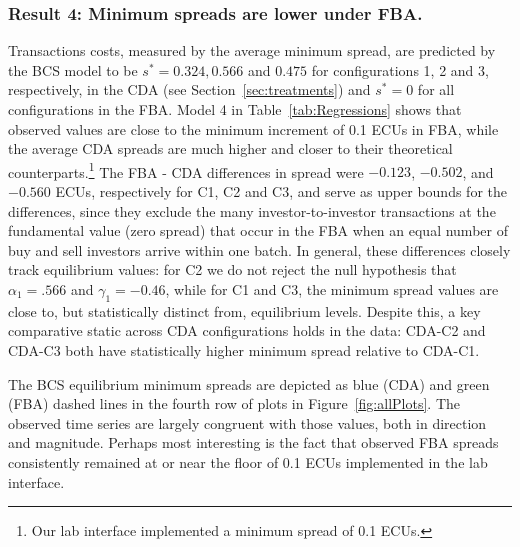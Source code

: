 \documentclass[12pt]{article}
\begin{document}
\subsubsection*{Result 4: Minimum spreads are lower under FBA.}
Transactions costs, measured by the average minimum spread, are predicted by the BCS model to be $s^*=0.324, 0.566$ and $0.475$ for configurations 1, 2 and 3, respectively, in the CDA (see Section~\ref{sec:treatments}) and $s^*=0$ for all configurations in the FBA. Model 4 in Table~\ref{tab:Regressions} shows that observed values are close to the minimum increment of 0.1 ECUs in FBA, while the average CDA spreads are much higher and closer to their theoretical counterparts.\footnote{Our lab interface implemented a minimum spread of 0.1 ECUs.} The FBA - CDA differences in spread were $-0.123$,  $-0.502$, and $-0.560$ ECUs, respectively for C1, C2 and C3, and serve as upper bounds for the differences, since they exclude the many investor-to-investor transactions at the fundamental value (zero spread) that occur in the FBA when an equal number of buy and sell investors arrive within one batch.
In general, these differences closely track equilibrium values: for C2 we do not reject the null hypothesis that $\alpha_1=.566$ and $\gamma_1=-0.46$, while for C1 and C3, the minimum spread values are close to, but statistically distinct from, equilibrium levels.
Despite this, a key comparative static across CDA configurations holds in the data: CDA-C2 and CDA-C3 both have statistically higher minimum spread relative to CDA-C1. 

The BCS equilibrium minimum spreads are depicted as blue (CDA) and green (FBA) dashed lines in the fourth row of plots in Figure~\ref{fig:allPlots}. The observed time series are largely congruent with those values, both in direction and magnitude. Perhaps most interesting is the fact that observed FBA spreads consistently remained at or near the floor of 0.1 ECUs implemented in the lab interface.
\end{document}
